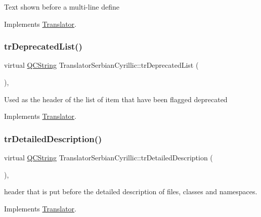 Text shown before a multi-\/line define 

Implements \mbox{\hyperlink{class_translator}{Translator}}.

\mbox{\label{class_translator_serbian_cyrillic_a43456ebb666ada43f0c69067c2bef5fe}} 
\subsubsection{\texorpdfstring{trDeprecatedList()}{trDeprecatedList()}}
{\footnotesize\ttfamily virtual \mbox{\hyperlink{class_q_c_string}{Q\+C\+String}} Translator\+Serbian\+Cyrillic\+::tr\+Deprecated\+List (\begin{DoxyParamCaption}{ }\end{DoxyParamCaption})\hspace{0.3cm}{\ttfamily [inline]}, {\ttfamily [virtual]}}

Used as the header of the list of item that have been flagged deprecated 

Implements \mbox{\hyperlink{class_translator}{Translator}}.

\mbox{\label{class_translator_serbian_cyrillic_aea457c0ab51df7694f0070e34bb6309d}} 
\subsubsection{\texorpdfstring{trDetailedDescription()}{trDetailedDescription()}}
{\footnotesize\ttfamily virtual \mbox{\hyperlink{class_q_c_string}{Q\+C\+String}} Translator\+Serbian\+Cyrillic\+::tr\+Detailed\+Description (\begin{DoxyParamCaption}{ }\end{DoxyParamCaption})\hspace{0.3cm}{\ttfamily [inline]}, {\ttfamily [virtual]}}

header that is put before the detailed description of files, classes and namespaces. 

Implements \mbox{\hyperlink{class_translator}{Translator}}.

